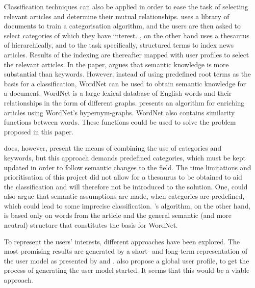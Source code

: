 Classification techniques can also be applied in order to ease the task of selecting relevant articles and determine their mutual relationships. \cite{gervasum2001ws.pdf} uses a library of documents to train a categorisation algorithm, and the users are then asked to select categories of which they have interest. \cite{10-1-1-19-5583}, on the other hand uses a thesaurus of hierarchically, and to the task specifically, structured terms to index news articles. Results of the indexing are thereafter mapped with user profiles to select the relevant articles. In the paper, \cite{10-1-1-19-5583} argues that semantic knowledge is more substantial than keywords. However, instead of using predefined root terms as the basis for a classification, WordNet can be used to obtain semantic knowledge for a document. WordNet is a large lexical database of English words and their relationships in the form of different graphs. \cite{116262780379.pdf} presents an algorithm for enriching articles using WordNet's hypernym-graphs. WordNet also contains similarity functions between words. These functions could be used to solve the problem proposed in this paper. %

\cite{fulltext.pdf} does, however, present the means of combining the use of categories and keywords, but this approach demands predefined categories, which must be kept updated in order to follow semantic changes to the field. The time limitations and prioritisation of this project did not allow for a thesaurus to be obtained to aid the classification and will therefore not be introduced to the solution. One, could also argue that semantic assumptions are made, when categories are predefined, which could lead to some imprecise classification. \cite{116262780379.pdf}'s algorithm, on the other hand, is based only on words from the article and the general semantic (and more neutral) structure that constitutes the basis for WordNet.
%
%

To represent the users' interests, different approaches have been explored. The most promising results are generated by a short- and long-term representation of the user model as presented by \cite{fulltext.pdf} and \cite{DataMiningMobasher}. \cite{fulltext.pdf} also propose a global user profile, to get the process of generating the user model started. It seems that this would be a viable approach.

